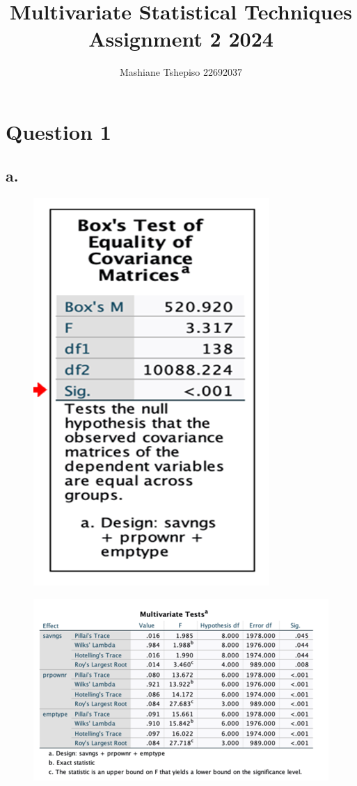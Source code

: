 \documentclass[english,10pt,a4paper]{article}
\title{Multivariate Statistical Techniques Assignment 2 2024}
\author{Mashiane Tshepiso 22692037}
\begin{document}
	\maketitle
	\section*{Question 1}
	\subsection*{a.}
	
		
	\begin{figure}[h]
	
		\includegraphics[width=0.2\linewidth]{Box's test2} 
		
	\end{figure}
		
	\begin{figure}[h]
		
		
		\includegraphics[width=1\linewidth]{Multivariate testQ1}
	\end{figure}
	
\end{document}
